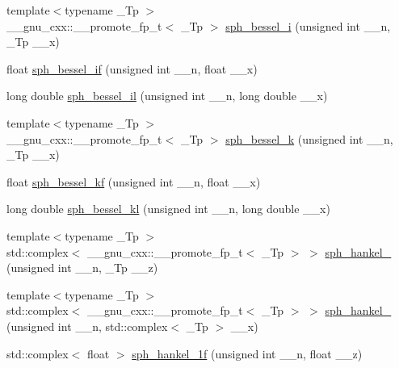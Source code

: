\begin{DoxyCompactItemize}
\item 
{\footnotesize template$<$typename \+\_\+\+Tp $>$ }\\\+\_\+\+\_\+gnu\+\_\+cxx\+::\+\_\+\+\_\+promote\+\_\+fp\+\_\+t$<$ \+\_\+\+Tp $>$ \hyperlink{group__gnu__math__spec__func_gad168511a86d4d25db99e2b08d5da038b}{sph\+\_\+bessel\+\_\+i} (unsigned int \+\_\+\+\_\+n, \+\_\+\+Tp \+\_\+\+\_\+x)
\item 
float \hyperlink{group__gnu__math__spec__func_gacc6738f18c1ba19452b9dd814d11c00c}{sph\+\_\+bessel\+\_\+if} (unsigned int \+\_\+\+\_\+n, float \+\_\+\+\_\+x)
\item 
long double \hyperlink{group__gnu__math__spec__func_gaf4392d9ed177913febdcbfccb947dbca}{sph\+\_\+bessel\+\_\+il} (unsigned int \+\_\+\+\_\+n, long double \+\_\+\+\_\+x)
\item 
{\footnotesize template$<$typename \+\_\+\+Tp $>$ }\\\+\_\+\+\_\+gnu\+\_\+cxx\+::\+\_\+\+\_\+promote\+\_\+fp\+\_\+t$<$ \+\_\+\+Tp $>$ \hyperlink{group__gnu__math__spec__func_ga9ad96c43b15e2c53d2f1b743e2eaa90f}{sph\+\_\+bessel\+\_\+k} (unsigned int \+\_\+\+\_\+n, \+\_\+\+Tp \+\_\+\+\_\+x)
\item 
float \hyperlink{group__gnu__math__spec__func_gaf886e8f8dfd2af0c4a9c5929d193d12f}{sph\+\_\+bessel\+\_\+kf} (unsigned int \+\_\+\+\_\+n, float \+\_\+\+\_\+x)
\item 
long double \hyperlink{group__gnu__math__spec__func_ga22f6a73e50e7020a7c2fa64ce1b9be41}{sph\+\_\+bessel\+\_\+kl} (unsigned int \+\_\+\+\_\+n, long double \+\_\+\+\_\+x)
\item 
{\footnotesize template$<$typename \+\_\+\+Tp $>$ }\\std\+::complex$<$ \+\_\+\+\_\+gnu\+\_\+cxx\+::\+\_\+\+\_\+promote\+\_\+fp\+\_\+t$<$ \+\_\+\+Tp $>$ $>$ \hyperlink{group__gnu__math__spec__func_ga04c91059810f366e3366fadef9084be7}{sph\+\_\+hankel\+\_} (unsigned int \+\_\+\+\_\+n, \+\_\+\+Tp \+\_\+\+\_\+z)
\item 
{\footnotesize template$<$typename \+\_\+\+Tp $>$ }\\std\+::complex$<$ \+\_\+\+\_\+gnu\+\_\+cxx\+::\+\_\+\+\_\+promote\+\_\+fp\+\_\+t$<$ \+\_\+\+Tp $>$ $>$ \hyperlink{group__gnu__math__spec__func_ga931f55fae4db5194ac96330908cba3f0}{sph\+\_\+hankel\+\_} (unsigned int \+\_\+\+\_\+n, std\+::complex$<$ \+\_\+\+Tp $>$ \+\_\+\+\_\+x)
\item 
std\+::complex$<$ float $>$ \hyperlink{group__gnu__math__spec__func_ga70d4fc01069f3f0ac0e3b52fe1dffea4}{sph\+\_\+hankel\+\_\+1f} (unsigned int \+\_\+\+\_\+n, float \+\_\+\+\_\+z)

\end{DoxyCompactItemize}
